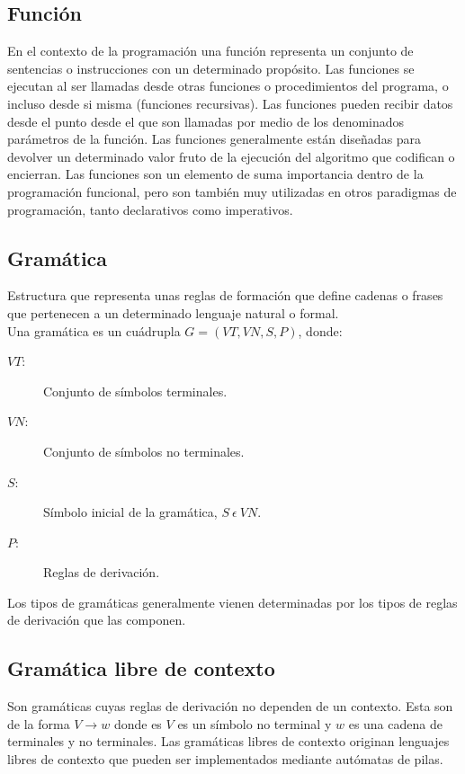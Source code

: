 \subsection{Función}
En el contexto de la programación una función representa un conjunto de sentencias o instrucciones con un determinado propósito. Las funciones se ejecutan al ser llamadas desde otras
funciones o procedimientos del programa, o incluso desde si misma (funciones recursivas). Las funciones pueden recibir datos desde el punto desde el que son llamadas por medio de los 
denominados parámetros de la función. Las funciones generalmente están diseñadas para devolver un determinado 
valor fruto de la ejecución del algoritmo que codifican o encierran. Las funciones son un elemento de suma importancia dentro de la programación funcional, pero son también muy utilizadas en otros paradigmas de programación, 
tanto declarativos como imperativos. \\

\subsection {Gramática}
Estructura que representa unas reglas de formación que define cadenas o frases que pertenecen a un determinado lenguaje natural o formal. \\

Una gramática es un cuádrupla $ G = (VT, VN, S, P) $, donde: \\

\begin {description}
\item[$VT$:] Conjunto de símbolos terminales.
\item[$VN$:] Conjunto de símbolos no terminales.
\item[$S$:] Símbolo inicial de la gramática, $S\ \epsilon\ VN$.
\item[$P$:] Reglas de derivación.
\end{description}

Los tipos de gramáticas generalmente vienen determinadas por los tipos de reglas de derivación que las componen.\\

\subsection {Gramática libre de contexto}
Son gramáticas cuyas reglas de derivación no dependen de un contexto. Esta son de la 
forma $V\rightarrow w$ donde es $V$ es un símbolo no terminal y $w$ es una cadena de terminales y no terminales.
Las gramáticas libres de contexto originan lenguajes libres de contexto que pueden ser implementados mediante
autómatas de pilas. \\

